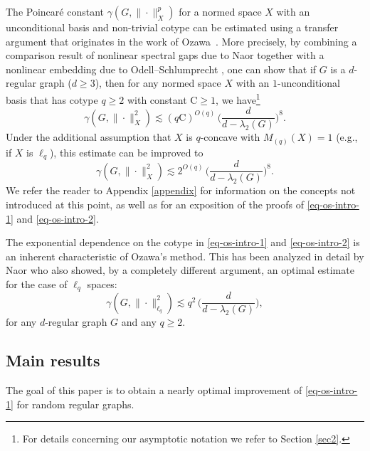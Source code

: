 \documentclass[11pt,leqno]{amsart}
\theoremstyle{remark}
\theoremstyle{plain}
\begin{document}
The Poincar\'{e} constant $\gamma(G,\|\cdot\|_X^p)$ for a normed space $X$ with an unconditional basis and non-trivial cotype
can be estimated using a  transfer argument that originates in the work of Ozawa~\cite{Oz04}.
More precisely, by combining a comparison result of nonlinear spectral gaps due to Naor \cite{Na14} together
with a nonlinear embedding due to Odell--Schlumprecht \cite{OS94}, one can show that if $G$ is
a $d$-regular graph ($d\geqslant 3$), then for any normed space $X$ with an $1$-unconditional basis that has cotype $q\geqslant 2$
with constant $\mathrm{C}\geqslant 1$, we have\footnote{For details concerning our asymptotic notation we refer to
Section \ref{sec2}.}
\begin{equation} \label{eq-os-intro-1}
\gamma(G,\|\cdot\|_X^2) \lesssim (q\mathrm{C})^{O(q)}\, \Big(\frac{d}{d-\lambda_2(G)}\Big)^8.
\end{equation}
Under the additional assumption that $X$ is $q$-concave with $M_{(q)}(X)=1$ (e.g., if $X$ is $\ell_q$), this estimate can be improved to
\begin{equation} \label{eq-os-intro-2}
\gamma(G,\|\cdot\|_X^2) \lesssim 2^{O(q)}\, \Big(\frac{d}{d-\lambda_2(G)}\Big)^8.
\end{equation}
We refer the reader to Appendix \ref{appendix} for information on the concepts not introduced at this point, as well as
for an exposition of the proofs of \eqref{eq-os-intro-1} and \eqref{eq-os-intro-2}.

The exponential dependence on the cotype in \eqref{eq-os-intro-1} and \eqref{eq-os-intro-2} is an inherent characteristic
of Ozawa's method. This has been analyzed in detail by Naor \cite{Na14} who also showed, by a completely
different argument, an optimal estimate for the case of $\ell_q$ spaces:
\[ \gamma(G,\|\cdot\|_{\ell_q}^2) \lesssim q^2\, \Big(\frac{d}{d-\lambda_2(G)}\Big), \]
for any $d$-regular graph $G$ and any $q\geqslant 2$.

\subsection{Main results}

The goal of this paper is to obtain a nearly optimal improvement of \eqref{eq-os-intro-1}
for random regular graphs.
\end{document}
